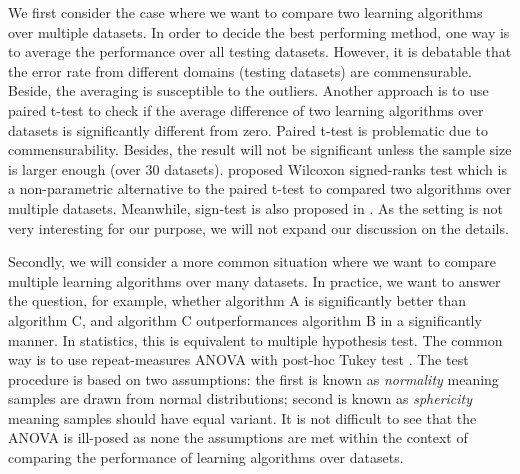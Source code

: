 {We first consider the case where we want to compare two learning algorithms over multiple datasets.
In order to decide the best performing method, one way is to average the performance over all testing datasets.
However, it is debatable that the error rate from different domains (testing datasets) are commensurable.
Beside, the averaging is susceptible to the outliers.
Another approach is to use paired t-test to check if the average difference of two learning algorithms over datasets is significantly different from zero.
Paired t-test is problematic due to commensurability.
Besides, the result will not be significant unless the sample size is larger enough (over 30 datasets).
\citet{Demsar06statistical} proposed Wilcoxon signed-ranks test which is a non-parametric alternative to the paired t-test to compared two algorithms over multiple datasets.
Meanwhile, sign-test is also proposed in \citep{Demsar06statistical}.
As the setting is not very interesting for our purpose, we will not expand our discussion on the details.

Secondly, we will consider a more common situation where we want to compare multiple learning algorithms over many datasets.
In practice, we want to answer the question, for example, whether algorithm A is significantly better than algorithm C, and algorithm C outperformances algorithm B in a significantly manner.
In statistics, this is equivalent to multiple hypothesis test.
The common way is to use repeat-measures ANOVA \citep{Fisher59statistical} with post-hoc Tukey test \citep{Turkey49comparing}. The test procedure is based on two assumptions: the first is known as \textit{normality} meaning samples are drawn from normal distributions; second is known as \textit{sphericity} meaning samples should have equal variant.
It is not difficult to see that the ANOVA is ill-posed as none the assumptions are met within the context of comparing the performance of learning algorithms over datasets.

}

